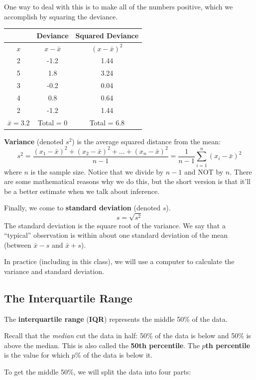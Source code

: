 \documentclass[
]{book}
\begin{document}
One way to deal with this is to make all of the numbers positive, which we accomplish by squaring the deviance.

\begin{longtable}[]{@{}ccc@{}}
\toprule\noalign{}
& Deviance & Squared Deviance \\
\midrule\noalign{}
\endhead
\bottomrule\noalign{}
\endlastfoot
\(x\) & \(x - \bar{x}\) & \((x - \bar{x})^2\) \\
2 & -1.2 & 1.44 \\
5 & 1.8 & 3.24 \\
3 & -0.2 & 0.04 \\
4 & 0.8 & 0.64 \\
2 & -1.2 & 1.44 \\
\(\bar{x}=3.2\) & Total = 0 & Total = 6.8 \\
\end{longtable}

\textbf{Variance} (denoted \(s^2\)) is the average squared distance from the mean:
\[
  s^2 = \frac{(x_1-\bar{x})^2 + (x_2-\bar{x})^2 + \dots + (x_n-\bar{x})^2}{n-1} = \frac{1}{n-1}\sum_{i=1}^n (x_i - \bar{x})^2
\]
where \(n\) is the sample size. Notice that we divide by \(n-1\) and NOT by \(n\). There are some mathematical reasons why we do this, but the short version is that it'll be a better estimate when we talk about inference.

Finally, we come to \textbf{standard deviation} (denoted \(s\)). \[s = \sqrt{s^2}\] The standard deviation is the square root of the variance. We say that a ``typical'' observation is within about one standard deviation of the mean (between \(\bar{x}-s\) and \(\bar{x}+s\)).

In practice (including in this class), we will use a computer to calculate the variance and standard deviation.

\subsection{The Interquartile Range}\label{the-interquartile-range}

The \textbf{interquartile range} (\textbf{IQR}) represents the middle 50\% of the data.

Recall that the \emph{median} cut the data in half: 50\% of the data is below and 50\% is above the median. This is also called the \textbf{50th percentile}. The \textbf{\(p\)th percentile} is the value for which \(p\)\% of the data is below it.

To get the middle 50\%, we will split the data into four parts:
\end{document}
